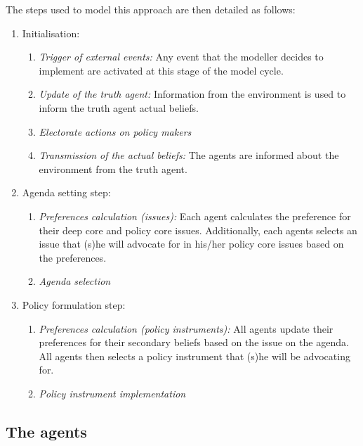 \documentclass[11pt]{article}
\begin{document}
The steps used to model this approach are then detailed as follows:

\begin{enumerate}
\item Initialisation:
	
	\begin{enumerate}
	\item \emph{Trigger of external events:} Any event that the modeller decides to implement are activated at this stage of the model cycle.
	\item \emph{Update of the truth agent:} Information from the environment is used to inform the truth agent actual beliefs.
	\item \emph{Electorate actions on policy makers}
	\item \emph{Transmission of the actual beliefs:} The agents are informed about the environment from the truth agent.
	\end{enumerate}
	
\item Agenda setting step:
	\begin{enumerate}
	\item \emph{Preferences calculation (issues):} Each agent calculates the preference for their deep core and policy core issues. Additionally, each agents selects an issue that (s)he will advocate for in his/her policy core issues based on the preferences.
	\item \emph{Agenda selection}
	\end{enumerate}
	
\item Policy formulation step:
	\begin{enumerate}
	\item \emph{Preferences calculation (policy instruments):} All agents update their preferences for their secondary beliefs based on the issue on the agenda. All agents then selects a policy instrument that (s)he will be advocating for.
	\item \emph{Policy instrument implementation} 
	\end{enumerate}

\end{enumerate}


\subsection{The agents}
\end{document}
